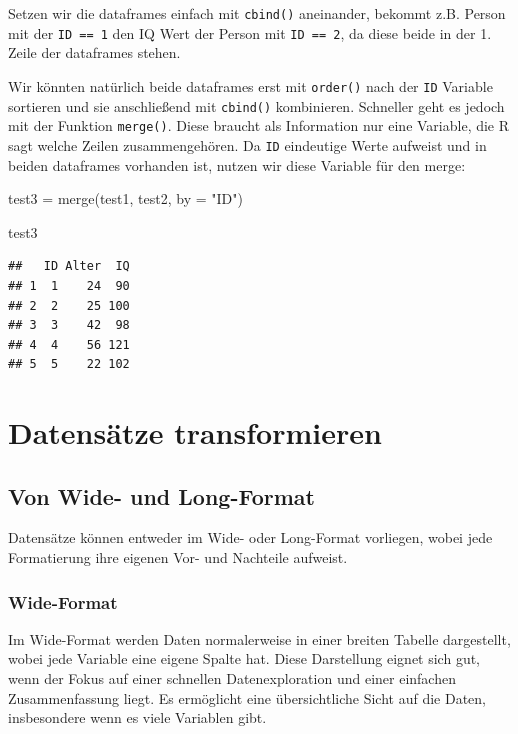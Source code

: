 \documentclass[
]{book}
\newenvironment{Shaded}{\begin{snugshade}}{\end{snugshade}}
\newcommand{\AttributeTok}[1]{\textcolor[rgb]{0.77,0.63,0.00}{#1}}
\newcommand{\FunctionTok}[1]{\textcolor[rgb]{0.00,0.00,0.00}{#1}}
\newcommand{\NormalTok}[1]{#1}
\newcommand{\OtherTok}[1]{\textcolor[rgb]{0.56,0.35,0.01}{#1}}
\newcommand{\StringTok}[1]{\textcolor[rgb]{0.31,0.60,0.02}{#1}}
\begin{document}
Setzen wir die dataframes einfach mit \texttt{cbind()} aneinander, bekommt z.B. Person mit der \texttt{ID\ ==\ 1} den IQ Wert der Person mit \texttt{ID\ ==\ 2}, da diese beide in der 1. Zeile der dataframes stehen.

Wir könnten natürlich beide dataframes erst mit \texttt{order()} nach der \texttt{ID} Variable sortieren und sie anschließend mit \texttt{cbind()} kombinieren. Schneller geht es jedoch mit der Funktion \texttt{merge()}. Diese braucht als Information nur eine Variable, die R sagt welche Zeilen zusammengehören. Da \texttt{ID} eindeutige Werte aufweist und in beiden dataframes vorhanden ist, nutzen wir diese Variable für den merge:

\begin{Shaded}
\begin{Highlighting}[]
\NormalTok{test3 }\OtherTok{=} \FunctionTok{merge}\NormalTok{(test1, test2, }\AttributeTok{by =} \StringTok{"ID"}\NormalTok{)}

\NormalTok{test3}
\end{Highlighting}
\end{Shaded}

\begin{verbatim}
##   ID Alter  IQ
## 1  1    24  90
## 2  2    25 100
## 3  3    42  98
## 4  4    56 121
## 5  5    22 102
\end{verbatim}

\hypertarget{datensuxe4tze-transformieren}{%
\section{Datensätze transformieren}\label{datensuxe4tze-transformieren}}

\hypertarget{von-wide--und-long-format}{%
\subsection{Von Wide- und Long-Format}\label{von-wide--und-long-format}}

Datensätze können entweder im Wide- oder Long-Format vorliegen, wobei jede Formatierung ihre eigenen Vor- und Nachteile aufweist.

\hypertarget{wide-format}{%
\subsubsection{Wide-Format}\label{wide-format}}

Im Wide-Format werden Daten normalerweise in einer breiten Tabelle dargestellt, wobei jede Variable eine eigene Spalte hat. Diese Darstellung eignet sich gut, wenn der Fokus auf einer schnellen Datenexploration und einer einfachen Zusammenfassung liegt. Es ermöglicht eine übersichtliche Sicht auf die Daten, insbesondere wenn es viele Variablen gibt.
\end{document}
